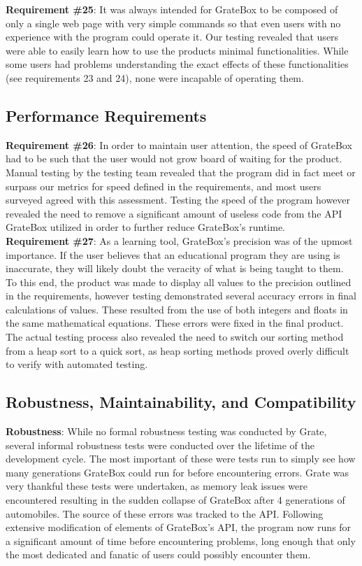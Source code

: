 \documentclass[12pt, titlepage]{article}
\begin{document}
\textbf{Requirement \#25}: It was always intended for GrateBox to be composed of only a single web page with very simple commands so that even users with no experience with the program could operate it. Our testing revealed that users were able to easily learn how to use the products minimal functionalities. While some users had problems understanding the exact effects of these functionalities (see requirements 23 and 24), none were incapable of operating them.

\subsection{Performance Requirements}

\textbf{Requirement \#26}: In order to maintain user attention, the speed of GrateBox had to be such that the user would not grow board of waiting for the product. Manual testing by the testing team revealed that the program did in fact meet or surpass our metrics for speed defined in the requirements, and most users surveyed agreed with this assessment. Testing the speed of the program however revealed the need to remove a significant amount of useless code from the API GrateBox utilized in order to further reduce GrateBox's runtime.\\

\textbf{Requirement \#27}: As a learning tool, GrateBox's precision was of the upmost importance. If the user believes that an educational program they are using is inaccurate, they will likely doubt the veracity of what is being taught to them. To this end, the product was made to display all values to the precision outlined in the requirements, however testing demonstrated several accuracy errors in final calculations of values. These resulted from the use of both integers and floats in the same mathematical equations. These errors were fixed in the final product. The actual testing process also revealed the need to switch our sorting method from a heap sort to a quick sort, as heap sorting methods proved overly difficult to verify with automated testing.

\subsection{Robustness, Maintainability, and Compatibility}

\textbf{Robustness}: While no formal robustness testing was conducted by Grate, several informal robustness tests were conducted over the lifetime of the development cycle. The most important of these were tests run to simply see how many generations GrateBox could run for before encountering errors. Grate was very thankful these tests were undertaken, as memory leak issues were encountered resulting in the sudden collapse of GrateBox after 4 generations of automobiles. The source of these errors was tracked to the API. Following extensive modification of elements of GrateBox's API, the program now runs for a significant amount of time before encountering problems, long enough that only the most dedicated and fanatic of users could possibly encounter them.\\
\end{document}
